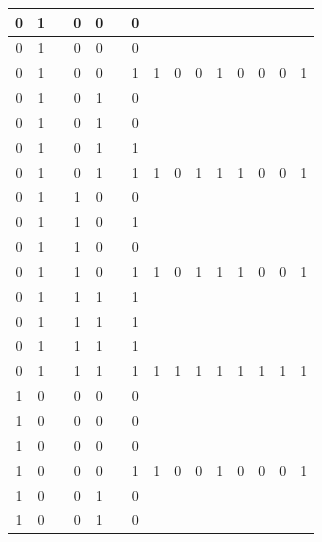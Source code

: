 \begin{table}[!tb]
\begin{tabular}{|c|c|c|c|c|c|c|c|c|c|c|c|c|c|c|}
        \rowcolor{yellow!40} 0 & 1 &  & 0 & 0 &  & 0 &  &  &  &  &  &  &  &  \\ \hline
        \rowcolor{yellow!40} 0 & 1 &  & 0 & 0 &  & 0 &  &  &  &  &  &  &  &  \\ \hline
        \rowcolor{yellow!40} 0 & 1 &  & 0 & 0 &  & 1 & 1 & 0 & 0 & 1 & 0 & 0 & 0 & 1 \\ \hline
        \rowcolor{gray!40} 0 & 1 &  & 0 & 1 &  & 0 &  &  &  &  &  &  &  &  \\ \hline
        \rowcolor{gray!40} 0 & 1 &  & 0 & 1 &  & 0 &  &  &  &  &  &  &  &  \\ \hline
        \rowcolor{gray!40} 0 & 1 &  & 0 & 1 &  & 1 &  &  &  &  &  &  &  &  \\ \hline
        \rowcolor{gray!40} 0 & 1 &  & 0 & 1 &  & 1 & 1 & 0 & 1 & 1 & 1 & 0 & 0 & 1 \\ \hline
        \rowcolor{blue!40} 0 & 1 &  & 1 & 0 &  & 0 &  &  &  &  &  &  &  &  \\ \hline
        \rowcolor{blue!40} 0 & 1 &  & 1 & 0 &  & 1 &  &  &  &  &  &  &  &  \\ \hline
        \rowcolor{blue!40} 0 & 1 &  & 1 & 0 &  & 0 &  &  &  &  &  &  &  &  \\ \hline
        \rowcolor{blue!40} 0 & 1 &  & 1 & 0 &  & 1 & 1 & 0 & 1 & 1 & 1 & 0 & 0 & 1 \\ \hline
        \rowcolor{red!40} 0 & 1 &  & 1 & 1 &  & 1 &  &  &  &  &  &  &  &  \\ \hline
        \rowcolor{red!40} 0 & 1 &  & 1 & 1 &  & 1 &  &  &  &  &  &  &  &  \\ \hline
        \rowcolor{red!40} 0 & 1 &  & 1 & 1 &  & 1 &  &  &  &  &  &  &  &  \\ \hline
        \rowcolor{red!40} 0 & 1 &  & 1 & 1 &  & 1 & 1 & 1 & 1 & 1 & 1 & 1 & 1 & 1 \\ \hline
        \rowcolor{green!40} 1 & 0 &  & 0 & 0 &  & 0 &  &  &  &  &  &  &  &  \\ \hline
        \rowcolor{green!40} 1 & 0 &  & 0 & 0 &  & 0 &  &  &  &  &  &  &  &  \\ \hline
        \rowcolor{green!40} 1 & 0 &  & 0 & 0 &  & 0 &  &  &  &  &  &  &  &  \\ \hline
        \rowcolor{green!40} 1 & 0 &  & 0 & 0 &  & 1 & 1 & 0 & 0 & 1 & 0 & 0 & 0 & 1 \\ \hline
        \rowcolor{yellow!40} 1 & 0 &  & 0 & 1 &  & 0 &  &  &  &  &  &  &  &  \\ \hline
        \rowcolor{yellow!40} 1 & 0 &  & 0 & 1 &  & 0 &  &  &  &  &  &  &  &  \\ \hline

\end{tabular}
\end{table}
